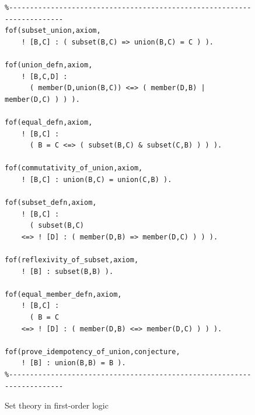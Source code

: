 \documentclass[runningheads]{llncs}
\begin{document}
\begin{figure}[htb]
\centering
{\footnotesize
{\setlength{\baselineskip}{3mm}
\begin{verbatim}
%------------------------------------------------------------------------
fof(subset_union,axiom,
    ! [B,C] : ( subset(B,C) => union(B,C) = C ) ).

fof(union_defn,axiom,
    ! [B,C,D] :
      ( member(D,union(B,C)) <=> ( member(D,B) | member(D,C) ) ) ).

fof(equal_defn,axiom,
    ! [B,C] :
      ( B = C <=> ( subset(B,C) & subset(C,B) ) ) ).

fof(commutativity_of_union,axiom,
    ! [B,C] : union(B,C) = union(C,B) ).

fof(subset_defn,axiom,
    ! [B,C] :
      ( subset(B,C)
    <=> ! [D] : ( member(D,B) => member(D,C) ) ) ).

fof(reflexivity_of_subset,axiom,
    ! [B] : subset(B,B) ).

fof(equal_member_defn,axiom,
    ! [B,C] :
      ( B = C
    <=> ! [D] : ( member(D,B) <=> member(D,C) ) ) ).

fof(prove_idempotency_of_union,conjecture,
    ! [B] : union(B,B) = B ).
%------------------------------------------------------------------------
\end{verbatim}
}}
\caption{Set theory in first-order logic}
\label{ExampleFOF}
\end{figure}
\end{document}
